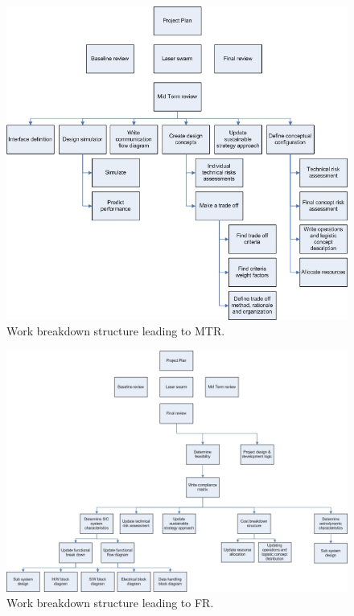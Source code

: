 \begin{figure} [H]
\begin{center}
\includegraphics[width=1.0\textwidth, angle=0]{chapters/img/Work_break_down_structure_MTR.jpg}
\end{center}
\caption{Work breakdown structure leading to MTR.}
\label{wbsmtr}
\end{figure}
\begin{figure} [H]
\begin{center}
\includegraphics[width=1.0\textwidth, angle=0]{chapters/img/Work_break_down_structure_FR.jpg}
\end{center}
\caption{Work breakdown structure leading to FR.}
\label{wbsfr}
\end{figure}